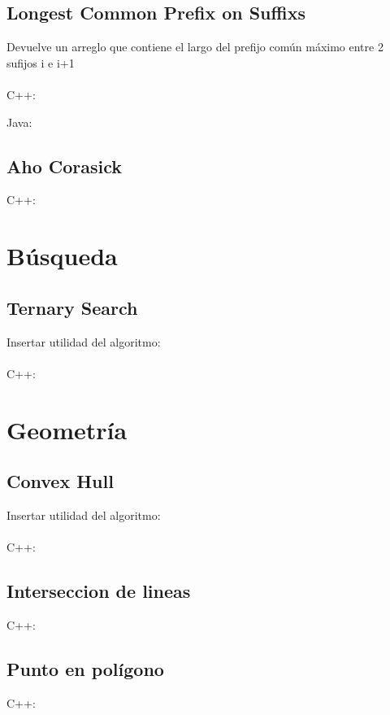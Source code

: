 \documentclass{article}
\begin{document}
    \subsection{Longest Common Prefix on Suffixs}
        Devuelve un arreglo que contiene el largo del prefijo común máximo entre 2 sufijos i e i+1
        \\ \\
        C++:
        
        Java:
        
    \subsection{Aho Corasick}
        C++:
        
\pagebreak
\section{Búsqueda}
    \subsection{Ternary Search}
        Insertar utilidad del algoritmo:
        \\ \\
        C++:
        
\pagebreak
\section{Geometría}
    \subsection{Convex Hull}
        Insertar utilidad del algoritmo:
        \\ \\
        C++:
        
    \subsection{Interseccion de lineas}
        C++:
        
    \subsection{Punto en polígono}
        C++:
        
\end{document}
